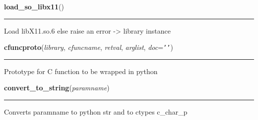     \label{xformslib:library:load_so_libx11}

    \vspace{0.5ex}

\hspace{.8\funcindent}\begin{boxedminipage}{\funcwidth}

    \raggedright \textbf{load\_so\_libx11}()

    \vspace{-1.5ex}

    \rule{\textwidth}{0.5\fboxrule}
\setlength{\parskip}{2ex}
    Load libX11.so.6 else raise an error -{\textgreater} library instance

\setlength{\parskip}{1ex}
    \end{boxedminipage}

    \label{xformslib:library:cfuncproto}

    \vspace{0.5ex}

\hspace{.8\funcindent}\begin{boxedminipage}{\funcwidth}

    \raggedright \textbf{cfuncproto}(\textit{library}, \textit{cfuncname}, \textit{retval}, \textit{arglist}, \textit{doc}={\tt \texttt{'}\texttt{}\texttt{'}})

    \vspace{-1.5ex}

    \rule{\textwidth}{0.5\fboxrule}
\setlength{\parskip}{2ex}
    Prototype for C function to be wrapped in python

\setlength{\parskip}{1ex}
    \end{boxedminipage}

    \label{xformslib:library:convert_to_string}

    \vspace{0.5ex}

\hspace{.8\funcindent}\begin{boxedminipage}{\funcwidth}

    \raggedright \textbf{convert\_to\_string}(\textit{paramname})

    \vspace{-1.5ex}

    \rule{\textwidth}{0.5\fboxrule}
\setlength{\parskip}{2ex}
    Converts paramname to python str and to ctypes c\_char\_p

\setlength{\parskip}{1ex}
    \end{boxedminipage}

